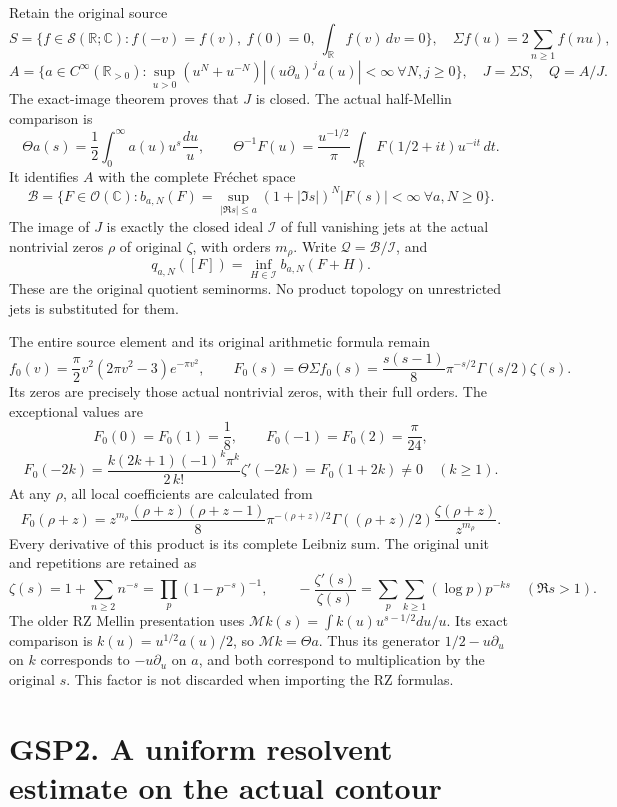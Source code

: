 Retain the original source \[
S=\{f\in\mathcal S(\mathbb R;\mathbb C):f(-v)=f(v),\ f(0)=0,
\ \int_{\mathbb R}f(v)\,dv=0\},
\quad \Sigma f(u)=2\sum_{n\ge1}f(nu),
\] \[
A=\{a\in C^\infty(\mathbb R_{>0}):
\sup_{u>0}(u^N+u^{-N})|(u\partial_u)^ja(u)|<\infty\ \forall N,j\ge0\},
\quad J=\Sigma S,\quad Q=A/J.
\tag{GSP1.1}
\] The exact-image theorem proves that \(J\) is closed. The actual
half-Mellin comparison is \[
\Theta a(s)=\frac12\int_0^\infty a(u)u^s\frac{du}{u},\qquad
\Theta^{-1}F(u)=\frac{u^{-1/2}}{\pi}
\int_{\mathbb R}F(1/2+it)u^{-it}\,dt.
\tag{GSP1.2}
\] It identifies \(A\) with the complete Fréchet space \[
\mathcal B=\{F\in\mathcal O(\mathbb C):
b_{a,N}(F)=\sup_{|\Re s|\le a}(1+|\Im s|)^N|F(s)|<\infty
\ \forall a,N\ge0\}.
\tag{GSP1.3}
\] The image of \(J\) is exactly the closed ideal \(\mathcal I\) of full
vanishing jets at the actual nontrivial zeros \(\rho\) of original
\(\zeta\), with orders \(m_\rho\). Write
\(\mathcal Q=\mathcal B/\mathcal I\), and \[
q_{a,N}([F])=\inf_{H\in\mathcal I}b_{a,N}(F+H).
\tag{GSP1.4}
\] These are the original quotient seminorms. No product topology on
unrestricted jets is substituted for them.

The entire source element and its original arithmetic formula remain \[
f_0(v)=\frac\pi2v^2(2\pi v^2-3)e^{-\pi v^2},\qquad
F_0(s)=\Theta\Sigma f_0(s)
=\frac{s(s-1)}8\pi^{-s/2}\Gamma(s/2)\zeta(s).
\tag{GSP1.5}
\] Its zeros are precisely those actual nontrivial zeros, with their
full orders. The exceptional values are \[
F_0(0)=F_0(1)=\frac18,\qquad F_0(-1)=F_0(2)=\frac\pi{24},
\] \[
F_0(-2k)=\frac{k(2k+1)(-1)^k\pi^k}{2\,k!}\zeta'(-2k)
=F_0(1+2k)\ne0\quad(k\ge1).
\tag{GSP1.6}
\] At any \(\rho\), all local coefficients are calculated from \[
F_0(\rho+z)=z^{m_\rho}
\frac{(\rho+z)(\rho+z-1)}8\pi^{-(\rho+z)/2}
\Gamma((\rho+z)/2)\frac{\zeta(\rho+z)}{z^{m_\rho}}.
\tag{GSP1.7}
\] Every derivative of this product is its complete Leibniz sum. The
original unit and repetitions are retained as \[
\zeta(s)=1+\sum_{n\ge2}n^{-s}=\prod_p(1-p^{-s})^{-1},\qquad
-\frac{\zeta'(s)}{\zeta(s)}=\sum_p\sum_{k\ge1}(\log p)p^{-ks}
\quad(\Re s>1).
\tag{GSP1.8}
\] The older RZ Mellin presentation uses
\(\mathcal Mk(s)=\int k(u)u^{s-1/2}du/u\). Its exact comparison is
\(k(u)=u^{1/2}a(u)/2\), so \(\mathcal Mk=\Theta a\). Thus its generator
\(1/2-u\partial_u\) on \(k\) corresponds to \(-u\partial_u\) on \(a\),
and both correspond to multiplication by the original \(s\). This factor
is not discarded when importing the RZ formulas.

\section{GSP2. A uniform resolvent estimate on the actual
contour}\label{gsp2.-a-uniform-resolvent-estimate-on-the-actual-contour}

